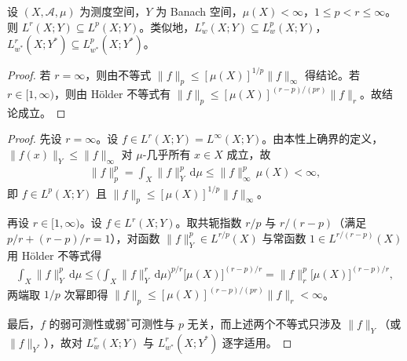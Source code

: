 \documentclass[../../main.tex]{subfiles}%
\begin{document}
\begin{proposition}\label{proposition:ch04-Lp包含阶}
设 $(X,\mathcal{A},\mu)$ 为测度空间，$Y$ 为 Banach 空间，$\mu(X)<\infty$，$1\leqslant p<r\leqslant\infty$。则 $L^r(X;Y)\subseteq L^p(X;Y)$。类似地，$L^r_w(X;Y)\subseteq L^p_w(X;Y)$，$L^r_{w^*}(X;Y^*)\subseteq L^p_{w^*}(X;Y^*)$。
\end{proposition}

\begin{proof}
若 $r=\infty$，则由不等式 $\|f\|_p\leqslant[\mu(X)]^{1/p}\|f\|_\infty$ 得结论。若 $r\in[1,\infty)$，则由 Hölder 不等式有 $\|f\|_p\leqslant[\mu(X)]^{(r-p)/(pr)}\|f\|_r$。故结论成立。
\end{proof}

\begin{proof}
先设 $r=\infty$。设 $f\in L^r(X;Y)=L^\infty(X;Y)$。由本性上确界的定义，$\|f(x)\|_Y\leqslant\|f\|_\infty$ 对 $\mu$-几乎所有 $x\in X$ 成立，故
\begin{align*}
\|f\|_p^p=\int_X\|f\|_Y^p\,\mathrm{d}\mu\leqslant\|f\|_\infty^p\,\mu(X)<\infty,
\end{align*}
即 $f\in L^p(X;Y)$ 且 $\|f\|_p\leqslant[\mu(X)]^{1/p}\|f\|_\infty$。

再设 $r\in[1,\infty)$。设 $f\in L^r(X;Y)$。取共轭指数 $r/p$ 与 $r/(r-p)$（满足 $p/r+(r-p)/r=1$），对函数 $\|f\|_Y^p\in L^{r/p}(X)$ 与常函数 $1\in L^{r/(r-p)}(X)$ 用 Hölder 不等式得
\begin{align*}
\int_X\|f\|_Y^p\,\mathrm{d}\mu\leqslant\Big(\int_X\|f\|_Y^r\,\mathrm{d}\mu\Big)^{p/r}\big[\mu(X)\big]^{(r-p)/r}=\|f\|_r^p\big[\mu(X)\big]^{(r-p)/r},
\end{align*}
两端取 $1/p$ 次幂即得 $\|f\|_p\leqslant[\mu(X)]^{(r-p)/(pr)}\|f\|_r<\infty$。

最后，$f$ 的弱可测性或弱$^*$可测性与 $p$ 无关，而上述两个不等式只涉及 $\|f\|_Y$（或 $\|f\|_{Y^*}$），故对 $L^r_w(X;Y)$ 与 $L^r_{w^*}(X;Y^*)$ 逐字适用。
\end{proof}
\end{document}
